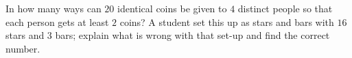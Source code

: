 In how many ways can $20$ identical coins be given to $4$ distinct people so that each person gets at least $2$ coins? A student set this up as stars and bars with $16$ stars and $3$ bars; explain what is wrong with that set-up and find the correct number.

